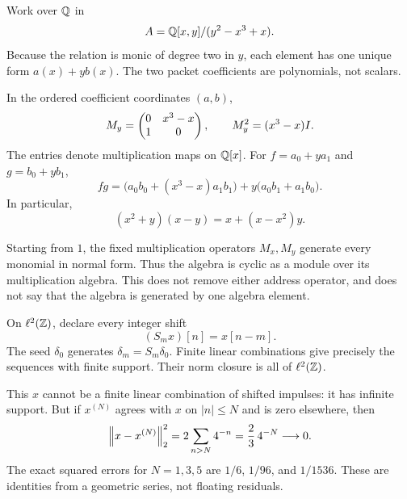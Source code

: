 Work over $\mathbb Q$ in
\[
A=\mathbb Q[x,y]/(y^2-x^3+x).
\]
Because the relation is monic of degree two in $y$, each element has one unique form $a(x)+yb(x)$. The two packet coefficients are polynomials, not scalars.


In the ordered coefficient coordinates $(a,b)$,
\[
M_y=\begin{pmatrix}0&x^3-x\\1&0\end{pmatrix},\qquad M_y^2=(x^3-x)I.
\]
The entries denote multiplication maps on $\mathbb Q[x]$. For $f=a_0+ya_1$ and $g=b_0+yb_1$,
\[
fg=\bigl(a_0b_0+(x^3-x)a_1b_1\bigr)
+y\bigl(a_0b_1+a_1b_0\bigr).
\]
In particular,
\[
(x^2+y)(x-y)=x+(x-x^2)y.
\]

Starting from $1$, the fixed multiplication operators $M_x,M_y$ generate every monomial in normal form. Thus the algebra is cyclic as a module over its multiplication algebra. This does not remove either address operator, and does not say that the algebra is generated by one algebra element.


On $\ell^2(\mathbb Z)$, declare every integer shift
\[
(S_mx)[n]=x[n-m].
\]
The seed $\delta_0$ generates $\delta_m=S_m\delta_0$. Finite linear combinations give precisely the sequences with finite support. Their norm closure is all of $\ell^2(\mathbb Z)$.


This $x$ cannot be a finite linear combination of shifted impulses: it has infinite support. But if $x^{(N)}$ agrees with $x$ on $|n|\le N$ and is zero elsewhere, then
\[
\left\lVert x-x^{(N)}\right\rVert_2^2
=2\sum_{n>N}4^{-n}
=\frac{2}{3}\,4^{-N}\longrightarrow0.
\]
The exact squared errors for $N=1,3,5$ are $1/6$, $1/96$, and $1/1536$. These are identities from a geometric series, not floating residuals.

